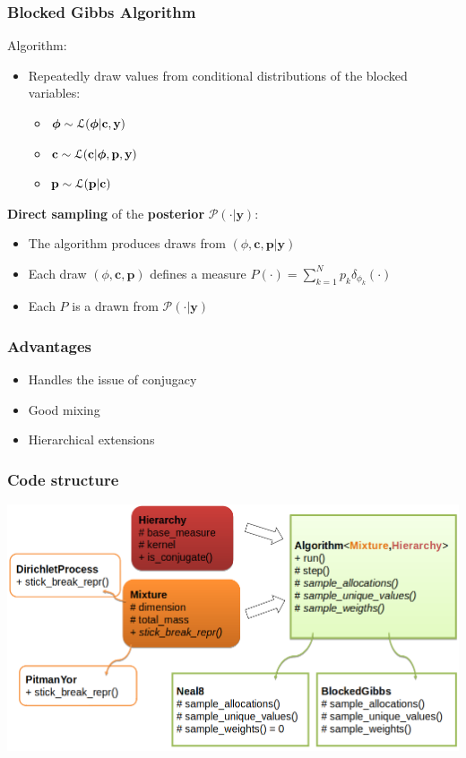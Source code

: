 \begin{frame}
	\frametitle{Blocked Gibbs Algorithm}
	Algorithm:
	\begin{itemize}
		\item Repeatedly draw values from conditional distributions of the blocked variables:
		\begin{itemize}
			\item $\boldsymbol\phi \sim \mathcal L(\boldsymbol\phi | \textbf{c}, \mathbf{y})$
			\item $\textbf{c} \sim \mathcal L (\textbf{c}| \boldsymbol\phi,\textbf{p}, \mathbf{y})$
			\item $\textbf{p} \sim \mathcal L (\textbf{p}| \textbf{c})$
		\end{itemize}
	\end{itemize}
	\textbf{Direct sampling} of the \textbf{posterior} $\mathscr{P}(\cdot|\mathbf{y})$:
	\begin{itemize}
    	\item The algorithm produces draws from $(\phi,\textbf{c},\textbf{p}| \mathbf{y})$
		\item Each draw $(\phi,\textbf{c},\textbf{p})$ defines a measure $P(\cdot)= \sum\limits_{k=1}^N  \mathit{p_{k}}\delta_{\phi_{k}}(\cdot) $
		\item Each $P$ is a drawn from $\mathscr{P}(\cdot|\mathbf{y})$
	\end{itemize}
\end{frame}

\begin{frame}
	\frametitle{Advantages}
		\begin{itemize}
		     \item Handles the issue of conjugacy
		    \item Good mixing %
		    \item Hierarchical extensions
	\end{itemize}
\end{frame}

\begin{frame}
	\frametitle{Code structure}
	\includegraphics[width=\linewidth]{etc/code_map.png}
\end{frame}

